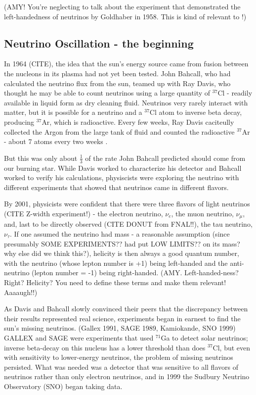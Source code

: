 (AMY!  You're neglecting to talk about the experiment that demonstrated the left-handedness of neutrinos by Goldhaber in 1958.  This is kind of relevant to \zvbb!)

\subsection{Neutrino Oscillation - the beginning}
In 1964 (CITE), the idea that the sun's energy source came from fusion between the nucleons in its plasma had not yet been tested.  John Bahcall, who had calculated the neutrino flux from the sun, teamed up with Ray Davis, who thought he may be able to count neutrinos using a large quantity of $^{37}$Cl - readily available in liquid form as dry cleaning fluid.  Neutrinos very rarely interact with matter, but it is possible for a neutrino and a $^{37}$Cl atom to inverse beta decay, producing $^{37}$Ar, which is radioactive.  Every few weeks, Ray Davis caciteully collected the Argon from the large tank of fluid and counted the radioactive $^{37}$Ar - about 7 atoms every two weeks \cite{Davis}.

But this was only about $\frac{1}{3}$ of the rate John Bahcall predicted should come from our burning star.  While Davis worked to characterize his detector and Bahcall worked to verify his calculations, physiscists were exploring the neutrino with different experiments that showed that neutrinos came in different flavors.

By 2001, physicists were confident that there were three flavors of light neutrinos (CITE Z-width experiment!) - the electron neutrino, $\nu_e$, the muon neutrino, $\nu_{\mu}$, and, last to be directly observed (CITE DONUT from FNAL!!), the tau neutrino, $\nu_{\tau}$.  If one assumed the neutrino had mass - a reasonable assumption (since presumably SOME EXPERIMENTS?? had put LOW LIMITS?? on its mass?  why else did we think this?), helicity is then always a good quantum number, with the neutrino (whose lepton number is +1) being left-handed and the anti-neutrino (lepton number = -1) being right-handed.  (AMY.  Left-handed-ness?  Right?  Helicity?  You need to define these terms and make them relevant!  Aaaaugh!!)

As Davis and Bahcall slowly convinced their peers that the discrepancy between their results represented real science, experiments began in earnest to find the sun's missing neutrinos.  (Gallex 1991, SAGE 1989, Kamiokande, SNO 1999)  GALLEX and SAGE were experiments that used $^{71}$Ga to detect solar neutrinos; inverse beta-decay on this nucleus has a lower threshold than does $^{37}$Cl, but even with sensitivity to lower-energy neutrinos, the problem of missing neutrinos persisted.  What was needed was a detector that was sensitive to all flavors of neutrinos rather than only electron neutrinos, and in 1999 the Sudbury Neutrino Observatory (SNO) began taking data.

